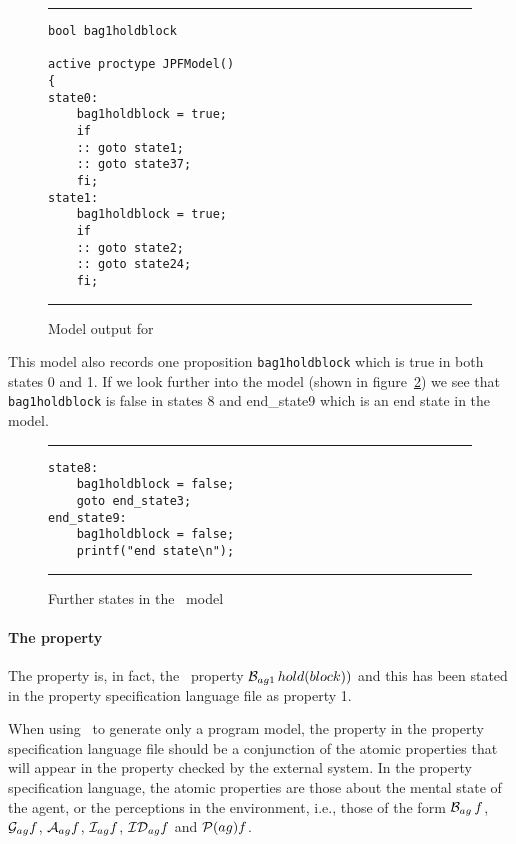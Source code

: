 \begin{figure}[htb]
\noindent\rule{\textwidth}{1pt}
\begin{small}
\begin{verbatim}
bool bag1holdblock

active proctype JPFModel()
{
state0:
	bag1holdblock = true;
	if
	:: goto state1;
	:: goto state37;
	fi;
state1:
	bag1holdblock = true;
	if
	:: goto state2;
	:: goto state24;
	fi;
\end{verbatim}
\end{small}
\rule{\textwidth}{1pt}
\caption{Model output for \spin}
\label{fig:spin_output}
\end{figure}


This model also records one proposition \texttt{bag1holdblock} which is true in both states 0 and 1. If we look further into the model (shown in figure~\ref{fig:spin_output2}) we see that \texttt{bag1holdblock} is false in states 8 and end\_state9 which is an end state in the model.


\begin{figure}[htb]
\noindent\rule{\textwidth}{1pt}
\begin{small}
\begin{verbatim}
state8:
	bag1holdblock = false;
	goto end_state3;
end_state9:
	bag1holdblock = false;
	printf("end state\n");
\end{verbatim}
\end{small}
\rule{\textwidth}{1pt}
\caption{Further states in the \spin\ model}
\label{fig:spin_output2}
\end{figure}

\paragraph{The property} The property is, in fact, the \ajpf\ property $\mathrm{{\cal B}}_{ag1} \, hold(block))$ and this has been stated in the property specification language file as property 1.  

When using \ajpf\ to generate only a program model, the property in the property specification language file should be a conjunction of the atomic properties that will appear in the property checked by the external system.  In the property specification language, the atomic properties are those about the mental state of the agent, or the perceptions in the environment, i.e., those of the form $\mathrm{{\cal B}}_{ag} \, f$, $\mathrm{{\cal G}}_{ag} f$, $\mathrm{{\cal A}}_{ag} f$, $\mathrm{{\cal I}}_{ag} f$, $\mathrm{{\cal ID}}_{ag} f$ and $\mathrm{{\cal P}}(ag){f}$.

